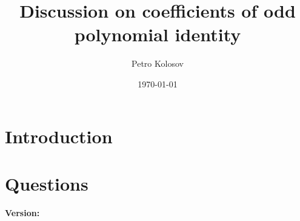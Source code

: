 \documentclass[12pt,letterpaper,oneside,reqno]{amsart}
\title[Discussion on coefficients of odd polynomial identity]
{Discussion on coefficients of odd polynomial identity}
\author[Petro Kolosov]{Petro Kolosov}
\date{\today}
\begin{document}
    \begin{abstract}
        
    \end{abstract}

    \maketitle


    \section{Introduction} \label{sec:introduction}
    

    \section{Questions}\label{sec:questions}
    

    \clearpage

    
    
    \noindent \textbf{Version:} 
\end{document}
